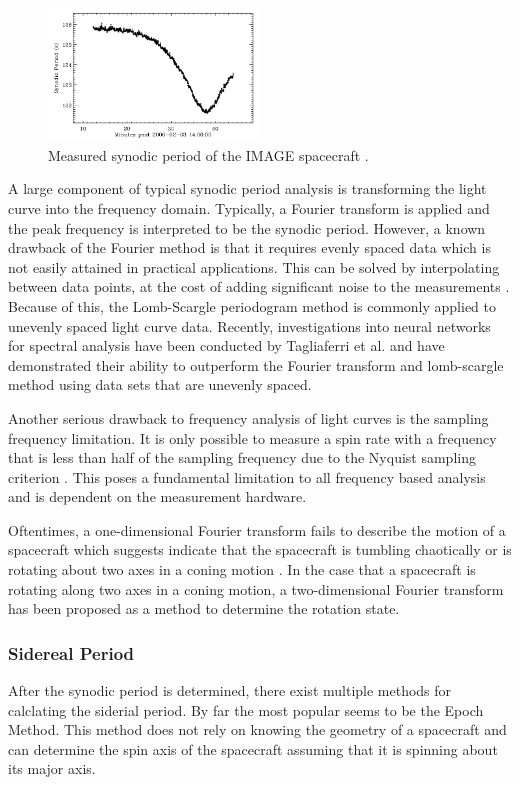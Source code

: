 \documentclass{article}
\begin{document}
\begin{figure}[h]
	\centering
	\includegraphics[width=0.5\textwidth]{synodic_period_AMOS}
	\caption{Measured synodic period of the IMAGE spacecraft \cite{AMOS}.}
\end{figure}

A large component of typical synodic period analysis is transforming the light curve into the frequency domain. Typically, a Fourier transform is applied and the peak frequency is interpreted to be the synodic period. However, a known drawback of the Fourier method is that it requires evenly spaced data which is not easily attained in practical applications. This can be solved by interpolating between data points, at the cost of adding significant noise to the measurements \cite{Tagliaferri}. Because of this, the Lomb-Scargle periodogram method is commonly applied to unevenly spaced light curve data. Recently, investigations into neural networks for spectral analysis have been conducted by Tagliaferri et al. \cite{Tagliaferri} and have demonstrated their ability to outperform the Fourier transform and lomb-scargle method using data sets that are unevenly spaced.

Another serious drawback to frequency analysis of light curves is the sampling frequency limitation. It is only possible to measure a spin rate with a frequency that is less than half of the sampling frequency due to the Nyquist sampling criterion \cite{SILHA2018844}. This poses a fundamental limitation to all frequency based analysis and is dependent on the measurement hardware. 

Oftentimes, a one-dimensional Fourier transform fails to describe the motion of a spacecraft which suggests indicate that the spacecraft is tumbling chaotically or is rotating about two axes in a coning motion \cite{Hall2014OpticalCO}. In the case that a spacecraft is rotating along two axes in a coning motion, a two-dimensional Fourier transform has been proposed as a method to determine the rotation state.

\subsubsection{Sidereal Period}
After the synodic period is determined, there exist multiple methods for calclating the siderial period. By far the most popular seems to be the Epoch Method. This method does not rely on knowing the geometry of a spacecraft and can determine the spin axis of the spacecraft assuming that it is spinning about its major axis. 
\end{document}
